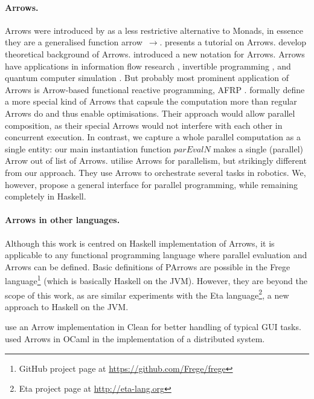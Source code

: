 \documentclass{jfp1}
\newcommand{\Varid}[1]{\mathit{#1}}
\renewcommand{\cite}[1]{\citep{#1}}
\begin{document}
\paragraph{Arrows.}
Arrows were introduced by \citet{HughesArrows} as a less restrictive alternative to Monads, in essence they are a generalised function arrow~\ensuremath{\to }. \citet{Hughes2005} presents a tutorial on Arrows. \citet{jacobs_heunen_hasuo_2009,LINDLEY201197,ATKEY201119} develop theoretical background of Arrows. \citet{Paterson:2001:NNA:507669.507664} introduced a new notation for Arrows. Arrows have applications in information flow research \cite{1648705,LI20101974,Russo:2008:LLI:1411286.1411289}, invertible programming \cite{Alimarine:2005:BAA:1088348.1088357}, and quantum computer simulation \cite{vizzotto_altenkirch_sabry_2006}. But probably most prominent application of Arrows is Arrow-based functional reactive programming, AFRP \cite{Nilsson:2002:FRP:581690.581695,Hudak2003,Czaplicki:2013:AFR:2499370.2462161}.
\citet{Liu:2009:CCA:1631687.1596559} formally define a more special kind of Arrows that capsule the computation more than regular Arrows do and thus enable optimisations. Their approach would allow parallel composition, as their special Arrows would not interfere with each other in concurrent execution. In contrast, we capture a whole parallel computation as a single entity: our main instantiation function \ensuremath{\Varid{parEvalN}} makes a single (parallel) Arrow out of list of Arrows. \citet{Huang2007} utilise Arrows for parallelism, but strikingly different from our approach. They use Arrows to orchestrate several tasks in robotics. We, however, propose a general interface for parallel programming, while remaining completely in Haskell.

\paragraph{Arrows in other languages.}
Although this work is centred on Haskell implementation of Arrows, it is applicable to any functional programming language where parallel evaluation and Arrows can be defined. Basic definitions of PArrows are possible in the Frege language\footnote{GitHub project page at \url{https://github.com/Frege/frege}} (which is basically Haskell on the JVM). However, they are beyond the scope of this work, as are similar experiments with the Eta language\footnote{Eta project page at \url{http://eta-lang.org}}, 
a new approach to Haskell on the JVM.

\citet{achten2004arrows,achten2007arrow} use an Arrow implementation in Clean for better handling of typical GUI tasks. \citet{Dagand:2009:ORD:1481861.1481870} used Arrows in OCaml in the implementation of a distributed system.
\end{document}
